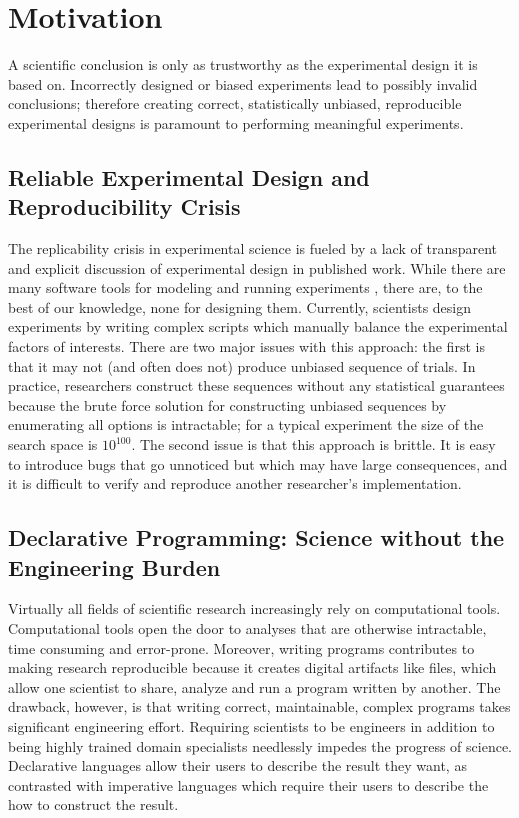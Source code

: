 
\chapter{Motivation}

A scientific conclusion is only as trustworthy as the experimental design it is based on. Incorrectly designed or biased experiments lead to possibly invalid conclusions; therefore creating correct, statistically unbiased, reproducible experimental designs is paramount to performing meaningful experiments.

\section{Reliable Experimental Design and Reproducibility Crisis}

The replicability crisis in experimental science is fueled by a lack of transparent and explicit discussion of experimental design in published work. While there are many software tools for modeling and running experiments \cite{cohen1993psyscope} \cite{mathot2012opensesame} \cite{peirce2009generating}, there are, to the best of our knowledge, none for designing them. Currently, scientists design experiments by writing complex scripts which manually balance the experimental factors of interests. There are two major issues with this approach: the first is that it may not (and often does not) produce unbiased sequence of trials. In practice, researchers construct these sequences without any statistical guarantees because the brute force solution for constructing unbiased sequences by enumerating all options is intractable; for a typical experiment the size of the search space is $10^{100}$. The second issue is that this approach is brittle. It is easy to introduce bugs that go unnoticed but which may have large consequences, and it is difficult to verify and reproduce another researcher's implementation.

\section{Declarative Programming: Science without the Engineering Burden}

Virtually all fields of scientific research increasingly rely on computational tools. Computational tools open the door to analyses that are otherwise intractable, time consuming and error-prone. Moreover, writing programs contributes to making research reproducible because it creates digital artifacts like files, which allow one scientist to share, analyze and run a program written by another. The drawback, however, is that writing correct, maintainable, complex programs takes significant engineering effort. Requiring scientists to be engineers in addition to being highly trained domain specialists needlessly impedes the progress of science. Declarative languages allow their users to describe the result they want, as contrasted with imperative languages which require their users to describe the how to construct the result.



